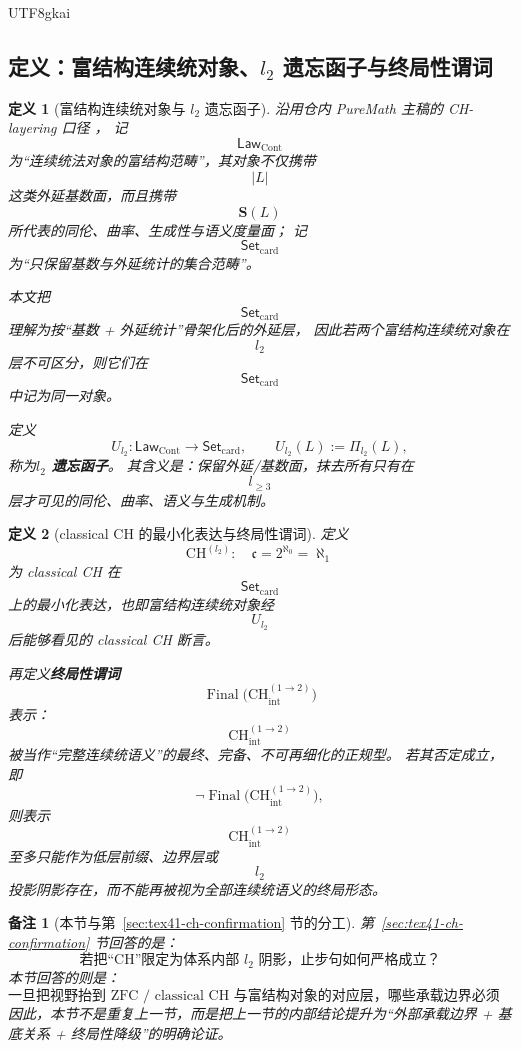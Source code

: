 \documentclass[12pt]{article}
\newtheorem{definition}{定义}[section]
\newtheorem{remark}{备注}[section]
\newcommand{\CHint}{\mathrm{CH}_{\mathrm{int}}}
\newcommand{\LawCont}{\mathsf{Law}_{\mathrm{Cont}}}
\newcommand{\SetCard}{\mathsf{Set}_{\mathrm{card}}}
\newcommand{\ForgetLtwo}{U_{l_2}}
\newcommand{\ProjLtwo}{\Pi_{l_2}}
\newcommand{\CHltwo}{\mathrm{CH}^{(l_2)}}
\newcommand{\Final}{\operatorname{Final}}
\begin{document}
\begin{CJK*}{UTF8}{gkai}
\subsection{定义：富结构连续统对象、$l_2$ 遗忘函子与终局性谓词}
\label{subsec:tex41-ch-zfc-defs}

\begin{definition}[富结构连续统对象与 $l_2$ 遗忘函子]
\label{def:tex41-ch-zfc-functor}
沿用仓内 PureMath 主稿的 CH-layering 口径
\cite{GaoZheng2025GFramework}，
记
\[
  \LawCont
\]
为“连续统法对象的富结构范畴”，其对象不仅携带
\[
  |L|
\]
这类外延基数面，而且携带
\[
  \mathbf{S}(L)
\]
所代表的同伦、曲率、生成性与语义度量面；
记
\[
  \SetCard
\]
为“只保留基数与外延统计的集合范畴”。

本文把
\[
  \SetCard
\]
理解为按“基数 + 外延统计”骨架化后的外延层，
因此若两个富结构连续统对象在
\[
  l_2
\]
层不可区分，则它们在
\[
  \SetCard
\]
中记为同一对象。

定义
\[
  \ForgetLtwo:\LawCont\to\SetCard,
  \qquad
  \ForgetLtwo(L):=\ProjLtwo(L),
\]
称为\textbf{$l_2$ 遗忘函子}。
其含义是：保留外延/基数面，抹去所有只有在
\[
  l_{\ge3}
\]
层才可见的同伦、曲率、语义与生成机制。
\end{definition}

\begin{definition}[classical CH 的最小化表达与终局性谓词]
\label{def:tex41-ch-zfc-finality}
定义
\[
  \CHltwo
  :
  \quad
  \mathfrak c=2^{\aleph_0}=\aleph_1
\]
为 classical CH 在
\[
  \SetCard
\]
上的最小化表达，也即富结构连续统对象经
\[
  \ForgetLtwo
\]
后能够看见的 classical CH 断言。

再定义\textbf{终局性谓词}
\[
  \Final\!\bigl(\CHint^{(1\to2)}\bigr)
\]
表示：
\[
  \CHint^{(1\to2)}
\]
被当作“完整连续统语义”的最终、完备、不可再细化的正规型。
若其否定成立，即
\[
  \neg\Final\!\bigl(\CHint^{(1\to2)}\bigr),
\]
则表示
\[
  \CHint^{(1\to2)}
\]
至多只能作为低层前缀、边界层或
\[
  l_2
\]
投影阴影存在，而不能再被视为全部连续统语义的终局形态。
\end{definition}

\begin{remark}[本节与第~\ref{sec:tex41-ch-confirmation} 节的分工]
第~\ref{sec:tex41-ch-confirmation} 节回答的是：
\[
  \text{若把“CH”限定为体系内部 }l_2\text{ 阴影，止步句如何严格成立？}
\]
本节回答的则是：
\[
  \text{一旦把视野抬到 ZFC / classical CH 与富结构对象的对应层，哪些承载边界必须说清？}
\]
因此，本节不是重复上一节，而是把上一节的内部结论提升为“外部承载边界 + 基底关系 + 终局性降级”的明确论证。
\end{remark}


\end{CJK*}
\end{document}
